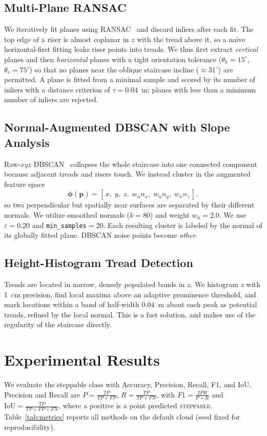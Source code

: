 \documentclass[conference]{IEEEtran}
\begin{document}
\subsection{Multi-Plane RANSAC}
We iteratively fit planes using RANSAC~\cite{fischler1981ransac} and discard inliers
after each fit. The top edge of a riser is almost coplanar in $z$ with the tread
above it, so a na\"ive horizontal-first fitting leaks riser points into treads. We
thus first extract \emph{vertical} planes and then \emph{horizontal} planes with a
tight orientation tolerance ($\theta_h=15^\circ$, $\theta_v=75^\circ$) so that no
planes near the oblique staircase incline ($\approx31^\circ$) are permitted. A plane
is fitted from a minimal sample and scored by its number of inliers with a distance
criterion of $\tau=0.04$~m; planes with less than a minimum number of inliers are
rejected.

\subsection{Normal-Augmented DBSCAN with Slope Analysis}
Raw-$xyz$ DBSCAN~\cite{ester1996dbscan} collapses the whole staircase into one
connected component because adjacent treads and risers touch. We instead cluster
in the augmented feature space
\begin{equation}
\boldsymbol{\phi}(\mathbf{p}) = [\,x,\; y,\; z,\; w_n n_x,\; w_n n_y,\; w_n n_z\,],
\end{equation}
so two perpendicular but spatially near surfaces are separated by their different
normals. We utilize smoothed normals ($k=80$) and weight $w_n=2.0$. We use
$\varepsilon=0.20$ and \texttt{min\_samples}$=20$. Each resulting cluster is labeled
by the normal of its globally fitted plane. DBSCAN noise points become \emph{other}.

\subsection{Height-Histogram Tread Detection}
Treads are located in narrow, densely populated bands in $z$. We histogram $z$ with
1~cm precision, find local maxima above an adaptive prominence threshold, and mark
locations within a band of half-width $0.04$~m about each peak as potential treads,
refined by the local normal. This is a fast solution, and makes use of the
regularity of the staircase directly.

\section{Experimental Results}
\label{sec:results}
We evaluate the steppable class with Accuracy, Precision, Recall, F1, and IoU.
Precision and Recall are
$P=\frac{TP}{TP+FP}$, $R=\frac{TP}{TP+FN}$, with
$F1=\frac{2PR}{P+R}$ and $\text{IoU}=\frac{TP}{TP+FP+FN}$, where a positive is a
point predicted \textsc{steppable}. Table~\ref{tab:metrics} reports all methods
on the default cloud (seed fixed for reproducibility).
\end{document}
